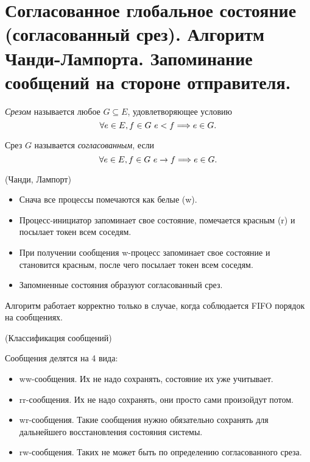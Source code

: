 \section{Согласованное глобальное состояние (согласованный срез).
Алгоритм Чанди-Лампорта. Запоминание сообщений на стороне отправителя.}

\begin{definition}
    \textit{Срезом} называется любое $G \subseteq E$, удовлетворяющее
    условию
    \[
        \forall e \in E, f \in G~ e < f \Longrightarrow e \in G
    .\]
\end{definition}

\begin{definition}
    Срез $G$ называется \textit{согласованным}, если
    \[
        \forall e \in E, f \in G~ e \to f \Longrightarrow e \in G
    .\]
\end{definition}

\begin{algorithm}(Чанди, Лампорт)
    \enewline
    \begin{itemize}
        \item Снача все процессы помечаются как белые (w).
        \item Процесс-инициатор запоминает свое состояние, помечается красным (r)
            и посылает токен всем соседям.
        \item При получении сообщения w-процесс запоминает свое состояние
            и становится красным, после чего посылает токен всем соседям.
        \item Запомненные состояния образуют согласованный срез.
    \end{itemize}
\end{algorithm}

\begin{remark}
    Алгоритм работает корректно только в случае, когда соблюдается FIFO
    порядок на сообщениях.
\end{remark}

\begin{remark}(Классификация сообщений)

    Сообщения делятся на 4 вида:
    \begin{itemize}
        \item ww-сообщения. Их не надо сохранять, состояние их уже учитывает. 
        \item rr-сообщения. Их не надо сохранять, они просто сами произойдут потом.
        \item wr-сообщения. Такие сообщения нужно обязательно сохранять для
            дальнейшего восстановления состояния системы.
        \item rw-сообщения. Таких не может быть по определению согласованного среза.
    \end{itemize}
\end{remark}

